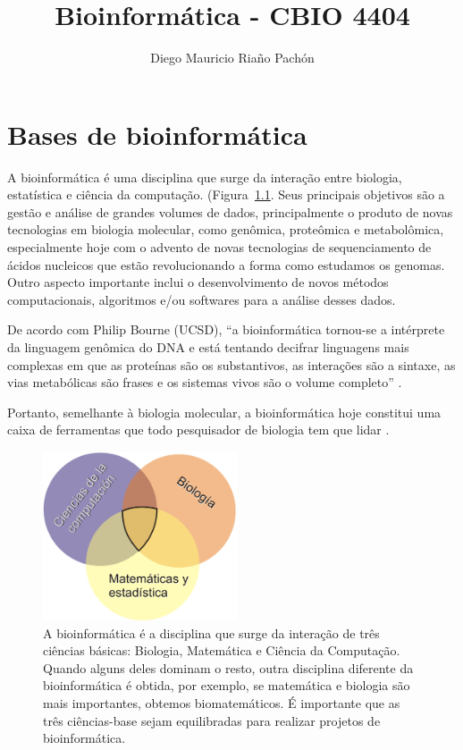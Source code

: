 \documentclass[letter,11pt]{book}
\author{Diego Mauricio Ria\~{n}o Pach\'{o}n}
\title{Bioinformática - CBIO 4404}
\begin{document}
\maketitle
\tableofcontents
\listoffigures

\chapter{Bases de bioinformática}


A bioinformática é uma disciplina que surge da interação entre biologia, estatística e ciência da computação. (Figura~\ref{bioinf}. Seus principais objetivos são a gestão e análise de grandes volumes de dados, principalmente o produto de novas tecnologias em biologia molecular, como genômica, proteômica e metabolômica, especialmente hoje com o advento de novas tecnologias de sequenciamento de ácidos nucleicos que estão revolucionando a forma como estudamos os genomas. Outro aspecto importante inclui o desenvolvimento de novos métodos computacionais, algoritmos e/ou softwares para a análise desses dados. 

De acordo com Philip Bourne (UCSD), ``a bioinformática tornou-se a intérprete da linguagem genômica do DNA e está tentando decifrar linguagens mais complexas em que as proteínas são os substantivos, as interações são a sintaxe, as vias metabólicas são frases e os sistemas vivos são o volume completo'' \citep{Bourne2004}.

Portanto, semelhante à biologia molecular, a bioinformática hoje constitui uma caixa de ferramentas que todo pesquisador de biologia tem que lidar \citetext{\citealp{Stein2008} apresenta um ponto de vista muito interessante}.

\begin{figure}[h]
\centering
   \includegraphics[height=5cm]{Figs/Bioinformatica.png}
  \caption[O que é bioinformática?]{\label{bioinf} A bioinformática é a disciplina que surge da interação de três ciências básicas: Biologia, Matemática e Ciência da Computação. Quando alguns deles dominam o resto, outra disciplina diferente da bioinformática é obtida, por exemplo, se matemática e biologia são mais importantes, obtemos biomatemáticos. É importante que as três ciências-base sejam equilibradas para realizar projetos de bioinformática.}
\end{figure}
\end{document}
